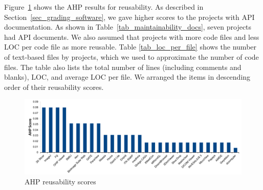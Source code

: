 \documentclass[final, 3p, times, authoryear]{elsarticle}
\begin{document}
Figure~\ref{fg_reusability_scores} shows the AHP results for reusability. As
described in Section~\ref{sec_grading_software}, we gave higher scores to the
projects with API documentation. As shown in
Table~\ref{tab_maintainability_docs}, seven projects had API documents. We also
assumed that projects with more code files and less LOC per code file as more
reusable. Table \ref{tab_loc_per_file} shows the number of text-based files by
projects, which we used to approximate the number of code files. The table also
lists the total number of lines (including comments and blanks), LOC, and
average LOC per file. We arranged the items in descending order of their
reusability scores.

\begin{figure}[!ht]
\includegraphics[scale=0.48]{figures/reusability_scores.pdf}
\caption{AHP reusability scores}
\label{fg_reusability_scores}
\end{figure}
\end{document}
